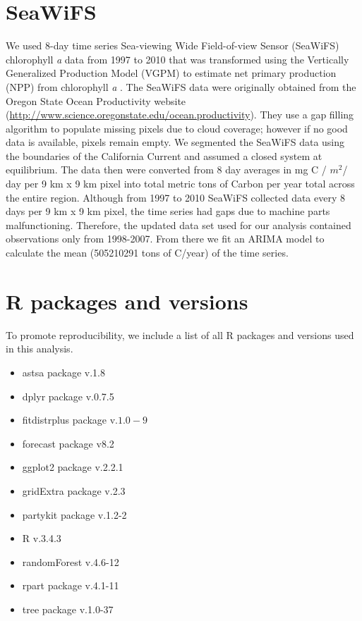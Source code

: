 \documentclass[oneside,12pt,final]{sty/ucthesis-CA2012}
\let\cite\citep                             %
\begin{document}
\begin{mainmatter}
\section{SeaWiFS}
We used 8-day time series Sea-viewing Wide Field-of-view Sensor (SeaWiFS) chlorophyll \textit{a} data from 1997 to 2010 that was transformed using the Vertically Generalized Production Model (VGPM) to estimate net primary production (NPP) from chlorophyll \textit{a} \cite{behrenfeld1997photosynthetic}. The SeaWiFS data were originally obtained from the Oregon State Ocean Productivity website (\url{http://www.science.oregonstate.edu/ocean.productivity}). They use a gap filling algorithm to populate missing pixels due to cloud coverage; however if no good data is available, pixels remain empty. We segmented the SeaWiFS data using the boundaries of the California Current and assumed a closed system at equilibrium. The data then were converted from 8 day averages in mg C / $m^2 $/ day per 9 km x 9 km pixel into total metric tons of Carbon per year total across the entire region. Although from 1997 to 2010 SeaWiFS collected data every 8 days per 9 km x 9 km pixel, the time series had gaps due to machine parts malfunctioning. Therefore, the updated data set used for our analysis contained observations only from 1998-2007. From there we fit an ARIMA model to calculate the mean (505210291 tons of C/year) of the time series. 

\section{R packages and versions}
To promote reproducibility, we include a list of all R packages and versions used in this analysis.

\begin{itemize}
\item astsa package v.1.8 \cite{astsa}
\item dplyr package v.0.7.5 \cite{wickham2015dplyr}
\item fitdistrplus package v.$1.0-9$ \cite{fitdistrplus}
\item forecast package v8.2 \cite{forecast1, forecast2} 
\item ggplot2 package v.2.2.1 \cite{ggplot}
\item gridExtra package v.2.3 \cite{gridextra}
\item partykit package v.1.2-2 \cite{hothorn2015partykit}
\item R v.3.4.3 \cite{Rcite} 
\item randomForest v.4.6-12 \cite{liaw2016classification}
\item rpart package v.4.1-11 \cite{therneau2015rpart}
\item tree package v.1.0-37 \cite{ripley2016tree}
\end{itemize}



\end{mainmatter}
\end{document}
